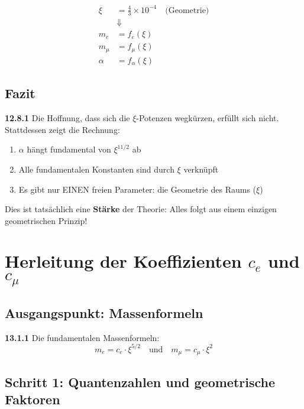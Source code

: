 \documentclass[12pt,a4paper]{article}
\begin{document}
\begin{equation}
	\boxed{
		\begin{aligned}
			\xi &= \frac{4}{3} \times 10^{-4} \quad \text{(Geometrie)} \\
			&\Downarrow \\
			m_e &= f_e(\xi) \\
			m_\mu &= f_\mu(\xi) \\
			\alpha &= f_\alpha(\xi)
		\end{aligned}
	}
\end{equation}

\subsection{Fazit}

\noindent \textbf{12.8.1} Die Hoffnung, dass sich die $\xi$-Potenzen wegkürzen, erfüllt sich nicht. Stattdessen zeigt die Rechnung:

\begin{enumerate}
	\item $\alpha$ hängt fundamental von $\xi^{11/2}$ ab
	\item Alle fundamentalen Konstanten sind durch $\xi$ verknüpft
	\item Es gibt nur EINEN freien Parameter: die Geometrie des Raums ($\xi$)
\end{enumerate}

Dies ist tatsächlich eine \textbf{Stärke} der Theorie: Alles folgt aus einem einzigen geometrischen Prinzip!


\section{Herleitung der Koeffizienten $c_e$ und $c_\mu$}

\subsection{Ausgangspunkt: Massenformeln}

\noindent \textbf{13.1.1} Die fundamentalen Massenformeln:
\[
m_e = c_e \cdot \xi^{5/2} \quad \text{und} \quad m_\mu = c_\mu \cdot \xi^2
\]

\subsection{Schritt 1: Quantenzahlen und geometrische Faktoren}
\end{document}
